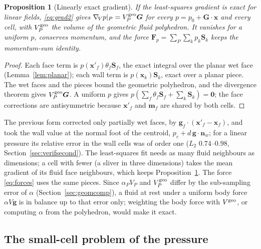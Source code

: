 \documentclass[11pt,a4paper]{article}
\newtheorem{proposition}{Proposition}
\theoremstyle{remark}
\newcommand{\nn}{\bm{n}}
\newcommand{\xx}{\bm{x}}
\newcommand{\Sf}{\bm{S}_f}
\newcommand{\gradV}{\nabla_{\!V}}
\begin{document}
\begin{proposition}[Linearly exact gradient]
\label{prop:grad2}
If the least-squares gradient is exact for linear fields, \eqref{eq:grad2} gives
$\gradV p|_P=V^{\rm geo}_P\bm G$ for every $p=p_0+\bm G\cdot\xx$ and every cell, with
$V^{\rm geo}_P$ the volume of the geometric fluid polyhedron. It vanishes for a uniform $p$,
conserves momentum, and the force $\bm F_p=\sum_P\sum_kp_k\bm S_k$ keeps the momentum-sum
identity.
\end{proposition}
\begin{proof}
Each face term is $p(\xx'_f)\theta_f\Sf$, the exact integral over the planar wet face
(Lemma~\ref{lem:planar}); each wall term is $p(\xx_k)\bm S_k$, exact over a planar piece. The wet
faces and the pieces bound the geometric polyhedron, and the divergence theorem gives
$V^{\rm geo}_P\bm G$. A uniform $p$ gives $p(\sum_f\theta_f\Sf+\sum_k\bm S_k)=\bm 0$; the face
corrections are antisymmetric because $\xx'_f$ and $\bm m_f$ are shared by both cells.
\end{proof}

The previous form corrected only partially wet faces, by $\bm g_f\cdot(\xx'_f-\xx_f)$, and took
the wall value at the normal foot of the centroid, $p_c+d\,\bm g\cdot\nn_w$; for a linear pressure
its relative error in the wall cells was of order one ($L_2$ $0.74$--$0.98$,
Section~\ref{sec:verifsecond}). The
least-squares fit needs as many fluid neighbours as dimensions; a cell with fewer (a sliver in
three dimensions) takes the mean gradient of its fluid face neighbours, which keeps
Proposition~\ref{prop:grad2}. The force \eqref{eq:forces} uses the same pieces. Since
$\alpha_PV_P$ and $V^{\rm geo}_P$ differ by the sub-sampling error of $\alpha$
(Section~\ref{sec:geomcomp}), a fluid at rest under a uniform body force $\alpha V\bm g$ is in
balance up to that error only; weighting the body force with $V^{\rm geo}$, or computing $\alpha$
from the polyhedron, would make it exact.

\subsection{The small-cell problem of the pressure}
\label{sec:smallcellp}
\end{document}
